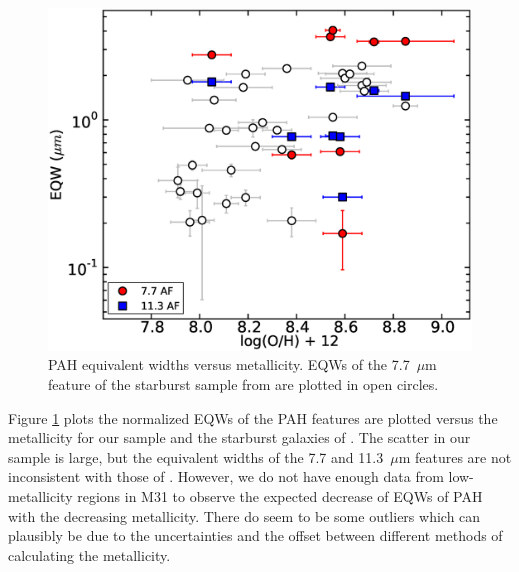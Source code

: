 \begin{figure}
\centering
\includegraphics[scale=0.27]{./oxyvseqw.eps}
\caption{ PAH equivalent widths versus metallicity. EQWs of the 7.7~$\mu$m feature of the starburst sample from \citet{Engelbracht_2008} are plotted in open circles.}
\label{metalicityVseqw}
\end{figure}

Figure \ref{metalicityVseqw} plots the normalized EQWs of the PAH features are plotted versus the metallicity for our sample and the starburst 
galaxies of \citet{Engelbracht_2008}. The scatter in our sample is large, but the 	
equivalent widths of the 7.7 and 11.3~$\mu$m features are not inconsistent with those of \citet{Engelbracht_2008}. 
However, we do not have enough data from low-metallicity regions in M31 to observe the expected decrease of EQWs of PAH with the decreasing 
metallicity.  There do seem to be some outliers which can plausibly be due to the uncertainties  and the offset between different methods of calculating the metallicity.  

